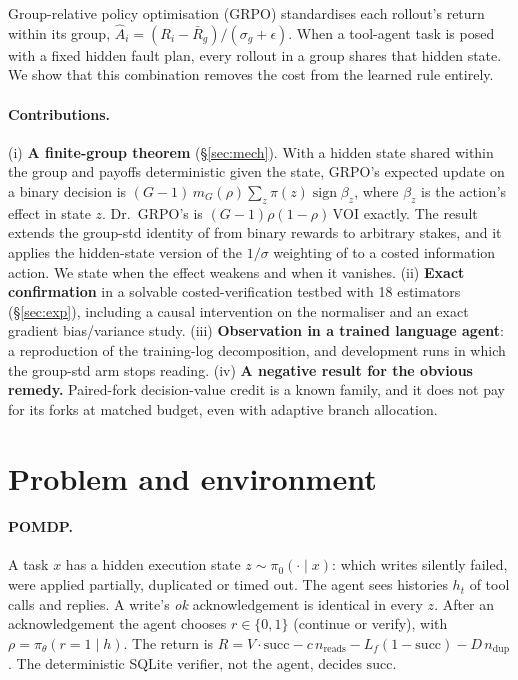 \documentclass[11pt]{article}
\newcommand{\sgn}{\operatorname{sign}}
\begin{document}
Group-relative policy optimisation (GRPO) standardises each rollout's return within its group,
$\hat A_i=(R_i-\bar R_g)/(\sigma_g+\epsilon)$. When a tool-agent task is posed with a fixed hidden fault plan, every
rollout in a group shares that hidden state. We show that this combination removes the cost from the learned rule
entirely.

\paragraph{Contributions.}
(i) \textbf{A finite-group theorem} (\S\ref{sec:mech}). With a hidden state shared within the group and payoffs
deterministic given the state, GRPO's expected update on a binary decision is
$(G{-}1)\,m_G(\rho)\sum_z\pi(z)\sgn\beta_z$, where $\beta_z$ is the action's effect in state $z$. Dr.~GRPO's is
$(G{-}1)\rho(1{-}\rho)\,\mathrm{VOI}$ exactly. The result extends the group-std identity of
\citet{bay2026identity} from binary rewards to arbitrary stakes, and it applies the hidden-state version of the
$1/\sigma$ weighting of \citet{bereket2025uncalibrated} to a costed information action. We state when the effect
weakens and when it vanishes.
(ii) \textbf{Exact confirmation} in a solvable costed-verification testbed with 18 estimators (\S\ref{sec:exp}),
including a causal intervention on the normaliser and an exact gradient bias/variance study.
(iii) \textbf{Observation in a trained language agent}: a reproduction of the training-log decomposition, and
development runs in which the group-std arm stops reading.
(iv) \textbf{A negative result for the obvious remedy.} Paired-fork decision-value credit is a known family, and it
does not pay for its forks at matched budget, even with adaptive branch allocation.

\section{Problem and environment}\label{sec:setup}

\paragraph{POMDP.} A task $x$ has a hidden execution state $z\sim\pi_0(\cdot\mid x)$: which writes silently failed,
were applied partially, duplicated or timed out. The agent sees histories $h_t$ of tool calls and replies. A write's
\emph{ok} acknowledgement is identical in every $z$. After an acknowledgement the agent chooses $r\in\{0,1\}$
(continue or verify), with $\rho=\pi_\theta(r{=}1\mid h)$. The return is
$R=V\cdot\mathrm{succ}-c\,n_{\mathrm{reads}}-L_f(1-\mathrm{succ})-D\,n_{\mathrm{dup}}$.
The deterministic SQLite verifier, not the agent, decides $\mathrm{succ}$.
\end{document}
